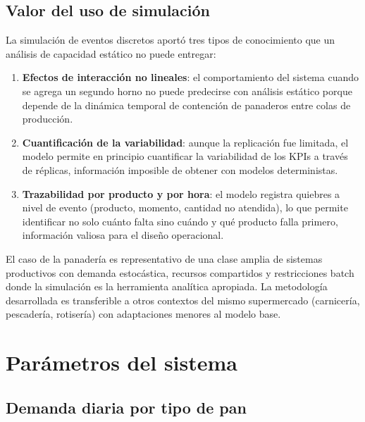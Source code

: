\documentclass[12pt]{article}
\begin{document}
\subsection{Valor del uso de simulación}

La simulación de eventos discretos aportó tres tipos de conocimiento que un análisis de capacidad estático no puede entregar:

\begin{enumerate}
  \item \textbf{Efectos de interacción no lineales}: el comportamiento del sistema cuando se agrega un segundo horno no puede predecirse con análisis estático porque depende de la dinámica temporal de contención de panaderos entre colas de producción.
  \item \textbf{Cuantificación de la variabilidad}: aunque la replicación fue limitada, el modelo permite en principio cuantificar la variabilidad de los KPIs a través de réplicas, información imposible de obtener con modelos deterministas.
  \item \textbf{Trazabilidad por producto y por hora}: el modelo registra quiebres a nivel de evento (producto, momento, cantidad no atendida), lo que permite identificar no solo cuánto falta sino cuándo y qué producto falla primero, información valiosa para el diseño operacional.
\end{enumerate}

El caso de la panadería es representativo de una clase amplia de sistemas productivos con demanda estocástica, recursos compartidos y restricciones batch donde la simulación es la herramienta analítica apropiada. La metodología desarrollada es transferible a otros contextos del mismo supermercado (carnicería, pescadería, rotisería) con adaptaciones menores al modelo base.

\appendix
\newpage
\section{Parámetros del sistema}

\subsection{Demanda diaria por tipo de pan}
\end{document}

